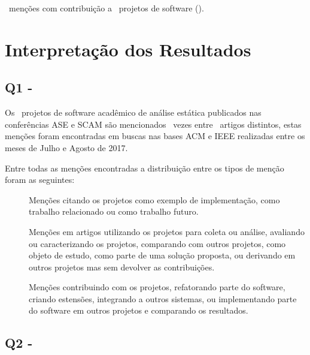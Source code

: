 
\ContributeStudyDoisCount \ menções com contribuição a
\ContributeStudyDoisSoftware \ projetos de software
().


\section{Interpretação dos Resultados} \label{estudo2:interpretacao} %

\subsection{Q1 - \EstudoDoisQuestaoUm}

Os \SoftwareCount \ projetos de software acadêmico de análise estática
publicados nas conferências ASE e SCAM são mencionados \ScreeningCount \ vezes
entre \ScreeningUniqueCount \ artigos distintos, estas menções foram encontradas
em buscas nas bases ACM e IEEE realizadas entre os meses de Julho e Agosto de
2017.

Entre todas as menções encontradas a distribuição entre os tipos de menção
foram as seguintes:

\begin{description}
  \item[\CiteCount]
    Menções citando os projetos como exemplo de implementação, como trabalho
    relacionado ou como trabalho futuro.

  \item[\UseCount]
    Menções em artigos utilizando os projetos para coleta ou análise, avaliando
    ou caracterizando os projetos, comparando com outros projetos, como objeto
    de estudo, como parte de uma solução proposta, ou derivando em outros
    projetos mas sem devolver as contribuições.

  \item[\ContributeCount]
    Menções contribuindo com os projetos, refatorando parte do software,
    criando estensões, integrando a outros sistemas, ou implementando parte do
    software em outros projetos e comparando os resultados.
\end{description}


\subsection{Q2 - \EstudoDoisQuestaoDois}


